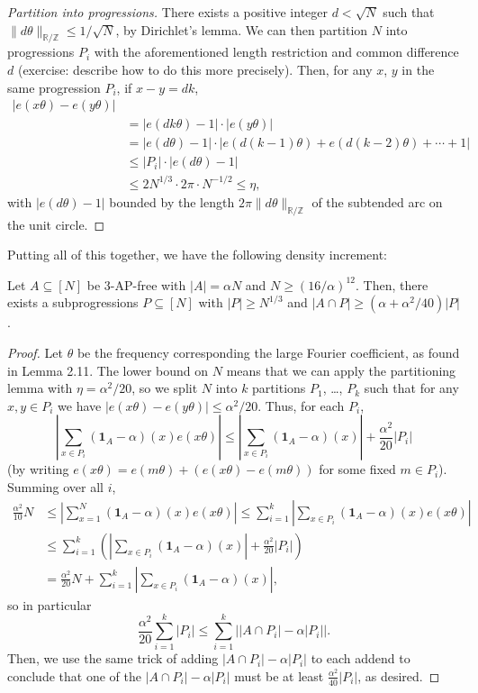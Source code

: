 \documentclass[10pt]{scrartcl}
\providecommand{\RR}{\mathbb R}
\providecommand{\ZZ}{\mathbb Z}
\providecommand{\ind}[1]{\mathbf 1_{#1}}
\providecommand{\abs}[1]{\left|{#1}\right|}
\providecommand{\norm}[1]{\| #1 \|}
\begin{document}
\begin{proof}[Partition into progressions]
	There exists a positive integer $d < \sqrt N$ such that
	$\norm{d\theta}_{\RR/\ZZ}\le1/\sqrt N$, by Dirichlet's lemma.
	We can then partition $N$ into progressions $P_i$
	with the aforementioned length restriction and common difference $d$
	(exercise: describe how to do this more precisely).
	Then, for any $x$, $y$ in the same progression $P_i$,
	if $x-y = dk$,
	\begin{align*}
		|e(x\theta) - e(y\theta)|\\
		&= |e(dk\theta) - 1|\cdot |e(y\theta)|\\
		&= |e(d\theta) - 1|\cdot|e(d(k-1)\theta) + e(d(k-2)\theta) +\cdots+ 1|\\
		&\le |P_i|\cdot |e(d\theta)-1|\\
		&\le 2N^{1/3}\cdot 2\pi\cdot N^{-1/2}\le \eta,
	\end{align*}
	with $|e(d\theta)-1|$ bounded by the length
	$2\pi\norm{d\theta}_{\RR/\ZZ}$ of the subtended arc on the unit circle.
\end{proof}

Putting all of this together, we have the following density increment:
\begin{lemma}
	Let $A\subseteq [N]$ be 3-AP-free with $|A| = \alpha N$ and
	$N\ge (16/\alpha)^{12}$. Then, there exists a subprogressions
	$P\subseteq [N]$ with $|P|\ge N^{1/3}$ and
	$|A\cap P|\ge (\alpha+\alpha^2/40)|P|$.
\end{lemma}

\begin{proof}
	Let $\theta$ be the frequency corresponding the large Fourier coefficient,
	as found in Lemma 2.11.
	The lower bound on $N$ means that we can apply the partitioning lemma
	with $\eta = \alpha^2/20$, so we split $N$ into $k$ partitions
	$P_1$, \dots, $P_k$ such that for any $x,y\in P_i$ we have
	$|e(x\theta)-e(y\theta)|\le \alpha^2/20$.
	Thus, for each $P_i$,
	\[\abs{\sum_{x\in P_i} (\ind A-\alpha)(x)e(x\theta)}
	\le \abs{\sum_{x\in P_i}(\ind A-\alpha)(x)} + \frac{\alpha^2}{20}|P_i|\]
	(by writing $e(x\theta) = e(m\theta) + (e(x\theta) - e(m\theta))$
	for some fixed $m\in P_i$). Summing over all $i$,
	\begin{align*}
		\frac{\alpha^2}{10}N
		&\le \abs{\sum_{x=1}^N (\ind A-\alpha)(x)e(x\theta)}
		\le \sum_{i=1}^k \abs{\sum_{x\in P_i}(\ind A-\alpha)(x)e(x\theta)}\\
		&\le \sum_{i=1}^k \left(\abs{\sum_{x\in P_i}(\ind A-\alpha)(x)}
		+ \frac{\alpha^2}{20}|P_i|\right)\\
		&= \frac{\alpha^2}{20}N +
		\sum_{i=1}^k \abs{\sum_{x\in P_i}(\ind A-\alpha)(x)},
	\end{align*}
	so in particular
	\[\frac{\alpha^2}{20}\sum_{i=1}^k |P_i|
	\le \sum_{i=1}^k \abs{|A\cap P_i|-\alpha|P_i|}.\]
	Then, we use the same trick of adding
	$|A\cap P_i| -\alpha|P_i|$ to each addend to conclude
	that one of the $|A\cap P_i|-\alpha|P_i|$
	must be at least $\frac{\alpha^2}{40}|P_i|$, as desired.
\end{proof}
\end{document}
